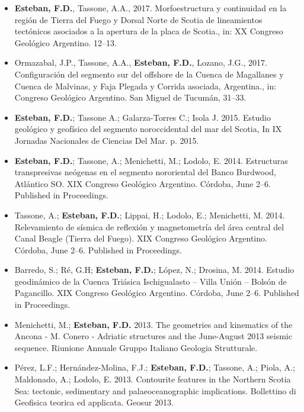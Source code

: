 \documentclass[11pt, a4paper]{article}
\begin{document}
\begin{itemize}
  \item \textbf{Esteban, F.D.}, Tassone, A.A., 2017. Morfoestructura y continuidad en la región de Tierra del Fuego y Dorsal Norte de Scotia de lineamientos tectónicos asociados a la apertura de la placa de Scotia., in: XX Congreso Geológico Argentino. 12–13.

  \item Ormazabal, J.P., Tassone, A.A., \textbf{Esteban, F.D.}, Lozano, J.G., 2017. Configuración del segmento sur del offshore de la Cuenca de Magallanes y Cuenca de Malvinas, y Faja Plegada y Corrida asociada, Argentina., in: Congreso Geológico Argentino. San Miguel de Tucumán, 31–33.

  \item \textbf{Esteban, F.D.}; Tassone A.; Galarza-Torres C.; Isola J. 2015. Estudio geológico y geofísico del segmento noroccidental del mar del Scotia, In IX Jornadas Nacionales de Ciencias Del Mar. p. 2015.

  \item \textbf{Esteban, F.D.}; Tassone, A.; Menichetti, M.; Lodolo, E. 2014. Estructuras transpresivas neógenas en el segmento nororiental del Banco Burdwood, Atlántico SO. XIX Congreso Geológico Argentino. Córdoba, June 2--6. Published in Proceedings.

  \item Tassone, A.; \textbf{Esteban, F.D.}; Lippai, H.; Lodolo, E.; Menichetti, M. 2014. Relevamiento de sísmica de reflexión y magnetometría del área central del Canal Beagle (Tierra del Fuego). XIX Congreso Geológico Argentino. Córdoba, June 2--6. Published in Proceedings.

  \item Barredo, S.; Ré, G.H; \textbf{Esteban, F.D.}; López, N.; Drosina, M. 2014. Estudio geodinámico de la Cuenca Triásica Ischigualasto – Villa Unión – Bolsón de Pagancillo. XIX Congreso Geológico Argentino. Córdoba, June 2--6. Published in Proceedings.

  \item Menichetti, M.; \textbf{Esteban, F.D.} 2013. The geometries and kinematics of the Ancona - M. Conero - Adriatic structures and the June-August 2013 seismic sequence. Riunione Annuale Gruppo Italiano Geologia Strutturale.

  \item Pérez, L.F.; Hernández-Molina, F.J.; \textbf{Esteban, F.D.}; Tassone, A.; Piola, A.; Maldonado, A.; Lodolo, E. 2013. Contourite features in the Northern Scotia Sea: tectonic, sedimentary and palaeoceanographic implications. Bollettino di Geofisica teorica ed applicata. Geosur 2013.


\end{itemize}
\end{document}
